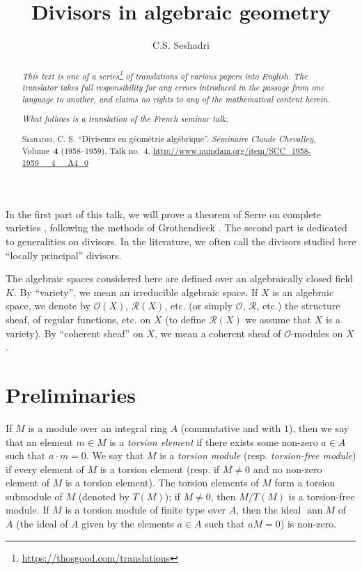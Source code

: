 \documentclass{article}
\title{Divisors in algebraic geometry}
\author{C.S. Seshadri}
\date{}
\newcommand{\doctype}{French seminar talk}
\newcommand{\origcit}{%
  \textsc{Seshadri, C. S.}
  ``Diviseurs en g\'{e}om\'{e}trie alg\'{e}brique''.
  \emph{S\'{e}minaire Claude Chevalley}, Volume~\textbf{4} (1958--1959), Talk no.~4.
  {\url{http://www.numdam.org/item/SCC_1958-1959__4__A4_0}}%
}
\newcommand{\scr}[1]{{\mathscr{#1}}}
\DeclareMathOperator{\ann}{ann}
\newcommand{\oldpage}[1]{\marginpar{\footnotesize$\Big\vert$ \textit{p.~#1}}}
\begin{document}
\maketitle
\thispagestyle{fancy}

\renewcommand{\abstractname}{Translator's note.}

\begin{abstract}
  \renewcommand*{\thefootnote}{\fnsymbol{footnote}}
  \emph{This text is one of a series\footnote{\url{https://thosgood.com/translations}} of translations of various papers into English.}
  \emph{The translator takes full responsibility for any errors introduced in the passage from one language to another, and claims no rights to any of the mathematical content herein.}

  \medskip
  
  \emph{What follows is a translation of the \doctype:}

  \medskip\noindent
  \origcit
\end{abstract}

\setcounter{footnote}{0}

\tableofcontents
\bigskip



\oldpage{4-01}
In the first part of this talk, we will prove a theorem of Serre on complete varieties \cite{6}, following the methods of Grothendieck \cite{4}.
The second part is dedicated to generalities on divisors.
In the literature, we often call the divisors studied here ``locally principal'' divisors.

The algebraic spaces considered here are defined over an algebraically closed field $K$.
By ``variety'', we mean an irreducible algebraic space.
If $X$ is an algebraic space, we denote by $\scr{O}(X)$, $\scr{R}(X)$, etc. (or simply $\scr{O}$, $\scr{R}$, etc.) the structure sheaf, of regular functions, etc. on $X$ (to define $\scr{R}(X)$ we assume that $X$ is a variety).
By ``coherent sheaf'' on $X$, we mean a coherent sheaf of $\scr{O}$-modules on $X$.


\section{Preliminaries}
\label{section1}

\cite{4,5,6}
\medskip

If $M$ is a module over an integral ring $A$ (commutative and with $1$), then we say that an element $m\in M$ is a \emph{torsion element} if there exists some non-zero $a\in A$ such that $a\cdot m=0$.
We say that $M$ is a \emph{torsion module} (resp. \emph{torsion-free module}) if every element of $M$ is a torsion element (resp. if $M\neq0$ and no non-zero element of $M$ is a torsion element).
The torsion elements of $M$ form a torsion submodule of $M$ (denoted by $T(M)$);
if $M\neq0$, then $M/T(M)$ is a torsion-free module.
If $M$ is a torsion module of finite type over $A$, then the ideal $\ann M$ of $A$ (the ideal of $A$ given by the elements $a\in A$ such that $aM=0$) is non-zero.
\end{document}
